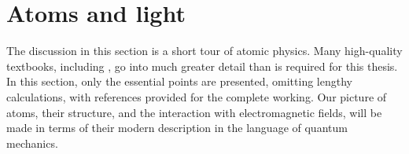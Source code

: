 
\section{Atoms and light}

	The discussion in this section is a short tour of atomic physics.
	Many high-quality textbooks, including \cite{FootAtomic,BinneyBook}, go into much greater detail than is required for this thesis.
	In this section, only the essential points are presented, omitting lengthy calculations, with references provided for the complete working.
	Our picture of atoms, their structure, and the interaction with electromagnetic fields, will be made in terms of their modern description in the language of quantum mechanics.

